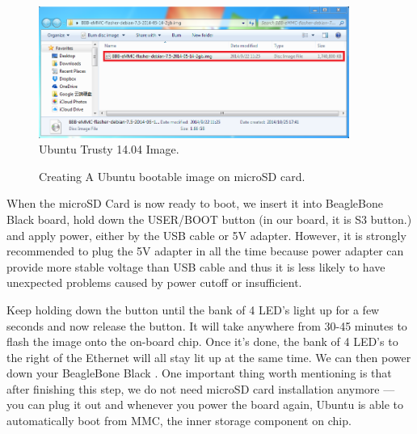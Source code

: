 \documentclass[12pt,journal,draftclsnofoot,onecolumn]{IEEEtran}
\begin{document}
\begin{figure}[htb]
	\centering
	\includegraphics[width=4in]{./figs/osimage.PNG}
	\caption{Ubuntu Trusty 14.04 Image.}
	\label{osimage}
\end{figure}

\begin{figure}[htb]
	\centering
     \caption{Creating A Ubuntu bootable image on microSD card.}
     \end{figure}

When the microSD Card is now ready to boot, we insert it into BeagleBone Black board, hold down the USER/BOOT button (in our board, it is S3 button.) and apply power, either by the USB cable or 5V adapter. However, it is strongly recommended to plug the 5V adapter in all the time because power adapter can provide more stable voltage than USB cable and thus it is less likely to have unexpected problems caused by power cutoff or insufficient.

Keep holding down the button until  the bank of 4 LED's light up for a few seconds and now release the button.
It will take anywhere from 30-45 minutes to flash the image onto the on-board chip. Once it's done, the bank of 4 LED's to the right of the Ethernet will all stay lit up at the same time. We can then power down your BeagleBone Black \cite{flashBB}. One important thing worth mentioning is that after finishing this step, we do not need microSD card installation anymore --- you can plug it out and whenever you power the board again, Ubuntu is able to automatically boot from MMC, the inner storage component on chip.
	
\end{document}
